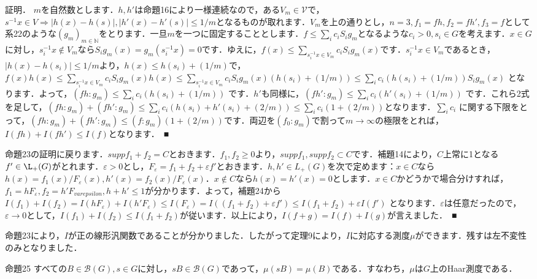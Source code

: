 証明．
$m$を自然数とします．$h,h'$は命題16により一様連続なので，ある$V_m \in \mathscr{V}$で，$s^{-1}x \in V \Rightarrow |h(x)-h(s)|, |h'(x)-h'(s)| \le 1/m$となるものが取れます．$V_m$を上の通りとし，$n=3, f_1=fh, f_2=fh', f_3=f$として系22のような$(g_m)_{m \in \mathbb{N}}$をとります．一旦$m$を一つに固定することとします．$f \le \sum_{i}c_i S_{i}g_m$となるような$c_i>0, s_i \in G$を考えます．$x \in G$に対し，$s_{i}^{-1}x \not\in V_m$なら$S_{i}g_{m}(x)=g_{m}(s_{i}^{-1}x)=0$です．ゆえに，$f(x) \le \sum_{s_{i}^{-1}x \in V_m} c_{i}S_{i}g_{m}(x)$です．$s_{i}^{-1}x \in V_m$であるとき，$|h(x)-h(s_i)| \le 1/m$より，$h(x) \le h(s_i)+(1/m)$で，$f(x)h(x) \le \sum_{s_{i}^{-1}x \in V_m} c_{i}S_{i}g_{m}(x)h(x) \le \sum_{s_{i}^{-1}x \in V_m} c_{i}S_{i}g_{m}(x)(h(s_i)+(1/m)) \le \sum_{i}c_{i}( h(s_i)+(1/m) )S_{i}g_{m}(x)$ となります．よって，$( fh \colon g_m ) \le \sum_{i}c_{i} ( h(s_i)+(1/m) )$ です．$h'$も同様に，$( fh' \colon g_m ) \le \sum_{i}c_{i} ( h'(s_i)+(1/m) )$ です．これら2式を足して，$( fh \colon g_m )+( fh' \colon g_m ) \le \sum_{i}c_{i} ( h(s_i)+h'(s_i)+(2/m) ) \le \sum_{i}c_{i} ( 1+(2/m) )$となります．$\sum_{i}c_{i}$ に関する下限をとって，$( fh \colon g_m )+( fh' \colon g_m ) \le ( f \colon g_m ) ( 1+(2/m) )$です．両辺を$(f_0 \colon g_m)$で割って$m \to \infty$の極限をとれば，$I(fh)+I(fh') \le I(f)$となります．　■

命題23の証明に戻ります．$supp f_{1}+f_{2}=C$とおきます．$f_1, f_2 \ge 0$より，$supp f_1, suppf_2 \subset C$です．補題14により，$C$上常に1となる$f' \in \L_{+}(G)$がとれます．$\varepsilon>0$とし，$F_{\varepsilon}=f_{1}+f_{2}+\varepsilon f'$とおきます．$h,h' \in L_{+}(G)$を次で定めます：$x \in C$なら$h(x)=f_{1}(x)/F_{\varepsilon}(x), h'(x)=f_{2}(x)/F_{\varepsilon}(x)$．$x \not\in C$なら$h(x)=h'(x)=0$とします．$x \in C$かどうかで場合分けすれば，$f_{1}=hF_{\varepsilon}, f_{2}=h'F_{varepsilon}, h+h' \le 1$が分かります．よって，補題24から$I(f_1)+I(f_2) = I(hF_{\varepsilon})+I(h'F_{\varepsilon}) \le I(F_{\varepsilon})=I ( (f_{1}+f_{2})+\varepsilon f' ) \le I(f_{1}+f_{2})+ \varepsilon I(f')$ となります．$\varepsilon$は任意だったので，$\varepsilon \to 0$として，$I(f_1)+I(f_2) \le I(f_{1}+f_{2})$が従います．以上により，$I(f+g)=I(f)+I(g)$が言えました．　■

命題23により，$I$が正の線形汎関数であることが分かりました．したがって定理9により，$I$に対応する測度$\mu$ができます．残すは左不変性のみとなりました．

命題25
すべての$B \in \mathscr{B}(G), s \in G$に対し，$sB \in \mathscr{B}(G)$であって，$\mu(sB)=\mu(B)$である．すなわち，$\mu$は$G$上のHaar測度である．

